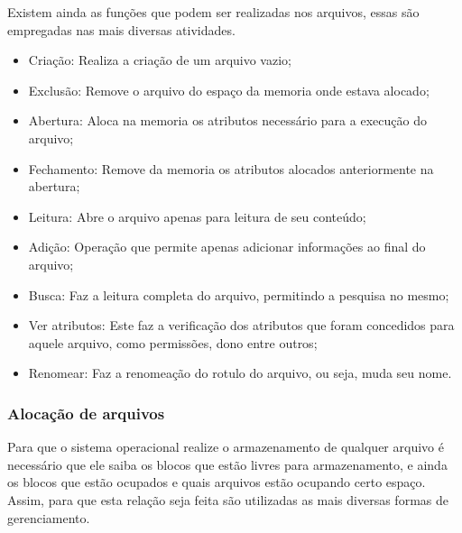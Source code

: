 \documentclass{article}
\begin{document}
Existem ainda as funções que podem ser realizadas nos arquivos, essas são empregadas nas mais diversas atividades.

\begin{itemize}

\item Criação: Realiza a criação de um arquivo vazio;
\item Exclusão: Remove o arquivo do espaço da memoria onde estava alocado;
\item Abertura: Aloca na memoria os atributos necessário para a execução do arquivo;
\item Fechamento: Remove da memoria os atributos alocados anteriormente na abertura;
\item Leitura: Abre o arquivo apenas para leitura de seu conteúdo;
\item Adição: Operação que permite apenas adicionar informações ao final do arquivo;
\item Busca: Faz a leitura completa do arquivo, permitindo a pesquisa no mesmo;
\item Ver atributos: Este faz a verificação dos atributos que foram concedidos para aquele arquivo, como permissões, dono entre outros;
\item Renomear: Faz a renomeação do rotulo do arquivo, ou seja, muda seu nome.

\end{itemize}

\subsubsection{Alocação de arquivos}

 Para que o sistema operacional realize o armazenamento de qualquer arquivo é necessário que ele saiba os blocos que estão livres para armazenamento, e ainda os blocos que estão ocupados e quais arquivos estão ocupando certo espaço. Assim, para que esta relação seja feita são utilizadas as mais diversas formas de gerenciamento.
\end{document}
